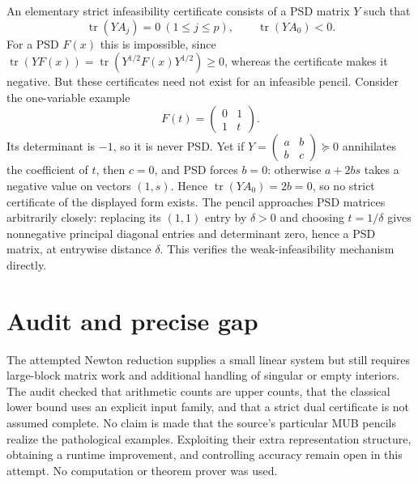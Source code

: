 \documentclass[11pt]{article}
\begin{document}
An elementary strict infeasibility certificate consists of a PSD
matrix $Y$ such that
\[
 \operatorname{tr}(YA_j)=0\ (1\le j\le p),\qquad
 \operatorname{tr}(YA_0)<0.
\]
For a PSD $F(x)$ this is impossible, since
$\operatorname{tr}(YF(x))=\operatorname{tr}(Y^{1/2}F(x)Y^{1/2})\ge0$,
whereas the certificate makes it negative. But these certificates
need not exist for an infeasible pencil. Consider the one-variable
example
\[
 F(t)=\begin{pmatrix}0&1\\1&t\end{pmatrix}.
\]
Its determinant is $-1$, so it is never PSD. Yet if
$Y=\left(\begin{smallmatrix}a&b\\b&c\end{smallmatrix}\right)\succeq0$
annihilates the coefficient of $t$, then $c=0$, and PSD forces
$b=0$: otherwise $a+2bs$ takes a negative value on vectors
$(1,s)$. Hence $\operatorname{tr}(YA_0)=2b=0$, so no strict
certificate of the displayed form exists. The pencil approaches
PSD matrices arbitrarily closely: replacing its $(1,1)$ entry
by $\delta>0$ and choosing $t=1/\delta$ gives nonnegative
principal diagonal entries and determinant zero, hence a PSD
matrix, at entrywise distance $\delta$. This verifies the
weak-infeasibility mechanism directly.

\section{Audit and precise gap}
The attempted Newton reduction supplies a small linear system
but still requires large-block matrix work and additional handling
of singular or empty interiors. The audit checked that arithmetic
counts are upper counts, that the classical lower bound uses an
explicit input family, and that a strict dual certificate is not
assumed complete. No claim is made that the source's particular
MUB pencils realize the pathological examples. Exploiting their
extra representation structure, obtaining a runtime improvement,
and controlling accuracy remain open in this attempt. No
computation or theorem prover was used.
\end{document}
